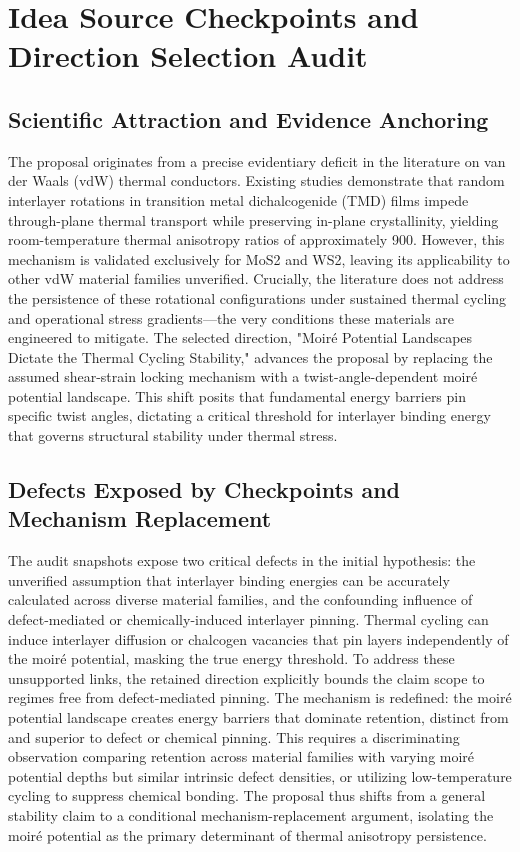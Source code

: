 \documentclass[conference]{IEEEtran}
\begin{document}
\section{Idea Source Checkpoints and Direction Selection Audit}
\subsection{Scientific Attraction and Evidence Anchoring}
The proposal originates from a precise evidentiary deficit in the literature on van der Waals (vdW) thermal conductors. Existing studies demonstrate that random interlayer rotations in transition metal dichalcogenide (TMD) films impede through-plane thermal transport while preserving in-plane crystallinity, yielding room-temperature thermal anisotropy ratios of approximately 900. However, this mechanism is validated exclusively for MoS2 and WS2, leaving its applicability to other vdW material families unverified. Crucially, the literature does not address the persistence of these rotational configurations under sustained thermal cycling and operational stress gradients---the very conditions these materials are engineered to mitigate. The selected direction, "Moiré Potential Landscapes Dictate the Thermal Cycling Stability," advances the proposal by replacing the assumed shear-strain locking mechanism with a twist-angle-dependent moiré potential landscape. This shift posits that fundamental energy barriers pin specific twist angles, dictating a critical threshold for interlayer binding energy that governs structural stability under thermal stress.~\cite{cite_26ecaf73d88dfe33}

\subsection{Defects Exposed by Checkpoints and Mechanism Replacement}
The audit snapshots expose two critical defects in the initial hypothesis: the unverified assumption that interlayer binding energies can be accurately calculated across diverse material families, and the confounding influence of defect-mediated or chemically-induced interlayer pinning. Thermal cycling can induce interlayer diffusion or chalcogen vacancies that pin layers independently of the moiré potential, masking the true energy threshold. To address these unsupported links, the retained direction explicitly bounds the claim scope to regimes free from defect-mediated pinning. The mechanism is redefined: the moiré potential landscape creates energy barriers that dominate retention, distinct from and superior to defect or chemical pinning. This requires a discriminating observation comparing retention across material families with varying moiré potential depths but similar intrinsic defect densities, or utilizing low-temperature cycling to suppress chemical bonding. The proposal thus shifts from a general stability claim to a conditional mechanism-replacement argument, isolating the moiré potential as the primary determinant of thermal anisotropy persistence.
\end{document}
